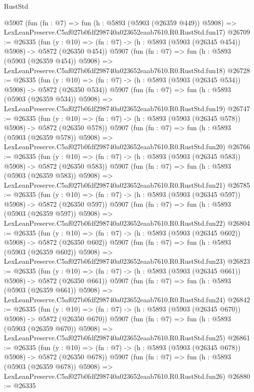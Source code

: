 \begin{lexlean}{RustStd}
\begin{coremodule}
    @5907
    (fun (fn : @7) =>
    fun (h : @5893 (@5903 (@26359 @449)) @5908) =>
    LexLeanPreserve.C5af027b0fdf298740a023652eaab7610.R0.RustStd.fun17)
@26709 := @26335
    (fun (y : @10) => (fn : @7) -> (h : @5893 (@5903 (@26345 @454)) @5908) -> @5872 (@26350 @454))
    @5907
    (fun (fn : @7) =>
    fun (h : @5893 (@5903 (@26359 @454)) @5908) =>
    LexLeanPreserve.C5af027b0fdf298740a023652eaab7610.R0.RustStd.fun18)
@26728 := @26335
    (fun (y : @10) => (fn : @7) -> (h : @5893 (@5903 (@26345 @534)) @5908) -> @5872 (@26350 @534))
    @5907
    (fun (fn : @7) =>
    fun (h : @5893 (@5903 (@26359 @534)) @5908) =>
    LexLeanPreserve.C5af027b0fdf298740a023652eaab7610.R0.RustStd.fun19)
@26747 := @26335
    (fun (y : @10) => (fn : @7) -> (h : @5893 (@5903 (@26345 @578)) @5908) -> @5872 (@26350 @578))
    @5907
    (fun (fn : @7) =>
    fun (h : @5893 (@5903 (@26359 @578)) @5908) =>
    LexLeanPreserve.C5af027b0fdf298740a023652eaab7610.R0.RustStd.fun20)
@26766 := @26335
    (fun (y : @10) => (fn : @7) -> (h : @5893 (@5903 (@26345 @583)) @5908) -> @5872 (@26350 @583))
    @5907
    (fun (fn : @7) =>
    fun (h : @5893 (@5903 (@26359 @583)) @5908) =>
    LexLeanPreserve.C5af027b0fdf298740a023652eaab7610.R0.RustStd.fun21)
@26785 := @26335
    (fun (y : @10) => (fn : @7) -> (h : @5893 (@5903 (@26345 @597)) @5908) -> @5872 (@26350 @597))
    @5907
    (fun (fn : @7) =>
    fun (h : @5893 (@5903 (@26359 @597)) @5908) =>
    LexLeanPreserve.C5af027b0fdf298740a023652eaab7610.R0.RustStd.fun22)
@26804 := @26335
    (fun (y : @10) => (fn : @7) -> (h : @5893 (@5903 (@26345 @602)) @5908) -> @5872 (@26350 @602))
    @5907
    (fun (fn : @7) =>
    fun (h : @5893 (@5903 (@26359 @602)) @5908) =>
    LexLeanPreserve.C5af027b0fdf298740a023652eaab7610.R0.RustStd.fun23)
@26823 := @26335
    (fun (y : @10) => (fn : @7) -> (h : @5893 (@5903 (@26345 @661)) @5908) -> @5872 (@26350 @661))
    @5907
    (fun (fn : @7) =>
    fun (h : @5893 (@5903 (@26359 @661)) @5908) =>
    LexLeanPreserve.C5af027b0fdf298740a023652eaab7610.R0.RustStd.fun24)
@26842 := @26335
    (fun (y : @10) => (fn : @7) -> (h : @5893 (@5903 (@26345 @670)) @5908) -> @5872 (@26350 @670))
    @5907
    (fun (fn : @7) =>
    fun (h : @5893 (@5903 (@26359 @670)) @5908) =>
    LexLeanPreserve.C5af027b0fdf298740a023652eaab7610.R0.RustStd.fun25)
@26861 := @26335
    (fun (y : @10) => (fn : @7) -> (h : @5893 (@5903 (@26345 @678)) @5908) -> @5872 (@26350 @678))
    @5907
    (fun (fn : @7) =>
    fun (h : @5893 (@5903 (@26359 @678)) @5908) =>
    LexLeanPreserve.C5af027b0fdf298740a023652eaab7610.R0.RustStd.fun26)
@26880 := @26335

\end{coremodule}
\end{lexlean}
